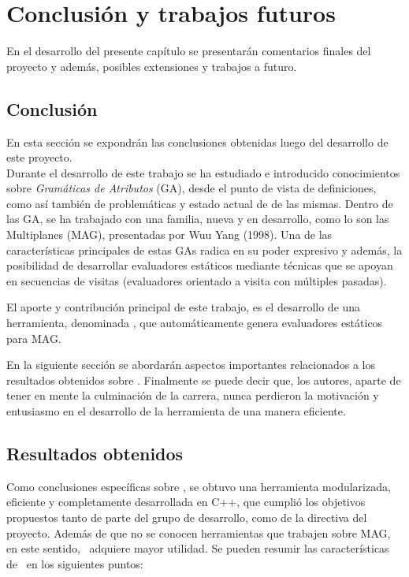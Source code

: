 \chapter{Conclusión y trabajos futuros}
\label{chap:conclusiones}

\minitoc

En el desarrollo del presente capítulo se presentarán comentarios finales del proyecto y además, posibles extensiones y trabajos a futuro.

\section{Conclusión}

En esta sección se expondrán las conclusiones obtenidas luego del desarrollo de este proyecto.\\

Durante el desarrollo de este trabajo se ha estudiado e introducido conocimientos sobre \textit{Gramáticas de Atributos} (GA), desde el punto de vista de definiciones, como así también de problemáticas y estado actual de de las mismas. Dentro de las GA, se ha trabajado con una familia, nueva y en desarrollo, como lo son las Multiplanes (MAG), presentadas por Wuu Yang (1998). Una de las características principales de estas GAs radica en su poder expresivo  y además, la posibilidad de desarrollar evaluadores estáticos mediante técnicas que se apoyan en secuencias de visitas (evaluadores orientado a visita con múltiples pasadas). 

El aporte y contribución principal de este trabajo, es el desarrollo de una herramienta, denominada \maggen, que automáticamente genera evaluadores estáticos para MAG.

En la siguiente sección se abordarán aspectos importantes relacionados a los resultados obtenidos sobre \maggen. Finalmente se puede decir que, los autores, aparte de tener en mente la culminación de la carrera, nunca perdieron la motivación y entusiasmo en el desarrollo de la herramienta de una manera eficiente.

\section{Resultados obtenidos}

Como conclusiones específicas sobre \maggen, se obtuvo una herramienta modularizada, eficiente y completamente desarrollada en C++, que cumplió los objetivos propuestos tanto de parte del grupo de desarrollo, como de la directiva del proyecto. Además de que no se conocen herramientas que trabajen sobre MAG, en este sentido, \maggen\ adquiere mayor utilidad. Se pueden resumir las características de \maggen\ en los siguientes puntos:

